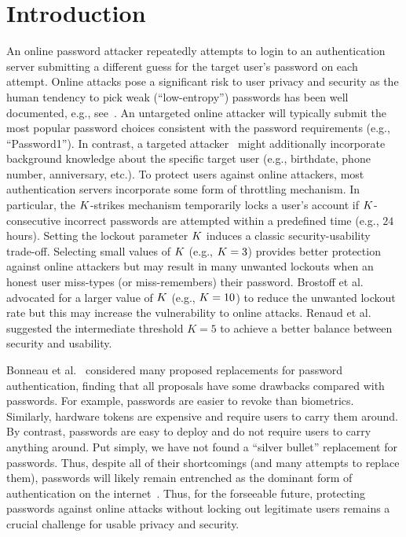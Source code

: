 
	\vspace*{-\baselineskip}
\section{Introduction}\label{sec: Introduction}
\vspace*{-\baselineskip}
An online password attacker repeatedly attempts to login to an authentication server submitting a different guess for the target user's password on each attempt. Online attacks pose a significant risk to user privacy and security as the human tendency to pick weak (``low-entropy'') passwords has been well documented, e.g., see~\cite{SP:Bonneau12}. An untargeted online attacker will typically submit the most popular password choices consistent with the password requirements (e.g., ``Password1''). In contrast, a targeted attacker~\cite{CCS:WZWYH16} might additionally incorporate background knowledge about the specific target user (e.g., birthdate, phone number, anniversary, etc.). To protect users against online attackers, most authentication servers incorporate some form of throttling mechanism. In particular, the $K$-strikes mechanism temporarily locks a user's account if $K$-consecutive incorrect passwords are attempted within a predefined time (e.g., $24$ hours). Setting the lockout parameter $K$ induces a classic security-usability trade-off. Selecting small values of $K$ (e.g., $K=3$) provides better protection against online attackers but may result in many unwanted lockouts when an honest user miss-types (or miss-remembers) their password. {Brostoff et al.~ \cite{brostoff2003ten} advocated for}  a larger value of $K$ (e.g., $K=10$) to reduce the unwanted lockout rate but {this} may increase {the vulnerability to} online attacks. {Renaud et al.~\cite{FiveStrikes:REWW14} suggested the intermediate threshold $K=5$ to achieve a better balance between security and usability. }


Bonneau et al.~\cite{SP:BHVS12} considered many proposed replacements for password authentication, finding that all proposals have some drawbacks compared with passwords. For example, passwords are easier to revoke than biometrics. Similarly, hardware tokens are expensive and require users to carry them around. By contrast, passwords are easy to deploy and do not require users to carry anything around. Put simply, we have not found a ``silver bullet'' replacement for passwords. Thus, despite all of their shortcomings (and many attempts to replace them), passwords will likely remain entrenched as the dominant form of authentication on the internet~\cite{PasswordPersistence}. Thus, for the forseeable future, protecting passwords against online attacks without locking out legitimate users remains a crucial challenge for usable privacy and security. 



